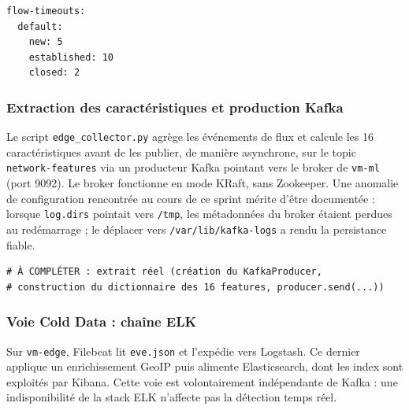 \begin{lstlisting}[style=ngidps, caption={Réglage des délais d'expiration des flux (\texttt{suricata.yaml})}, label={lst:suricata-timeouts}]
flow-timeouts:
  default:
    new: 5
    established: 10
    closed: 2
\end{lstlisting}


\subsubsection{Extraction des caractéristiques et production Kafka}

Le script \texttt{edge\_collector.py} agrège les événements de flux et calcule les 16 caractéristiques avant de les publier, de manière asynchrone, sur le topic \texttt{network-features} via un producteur Kafka pointant vers le broker de \texttt{vm-ml} (port 9092). Le broker fonctionne en mode KRaft, sans Zookeeper. Une anomalie de configuration rencontrée au cours de ce sprint mérite d'être documentée : lorsque \texttt{log.dirs} pointait vers \texttt{/tmp}, les métadonnées du broker étaient perdues au redémarrage ; le déplacer vers \texttt{/var/lib/kafka-logs} a rendu la persistance fiable.

\begin{lstlisting}[style=ngidps, caption={Extrait de \texttt{edge\_collector.py} : publication du vecteur de caractéristiques}, label={lst:edge-collector}]
# À COMPLÉTER : extrait réel (création du KafkaProducer,
# construction du dictionnaire des 16 features, producer.send(...))
\end{lstlisting}


\subsubsection{Voie Cold Data : chaîne ELK}

Sur \texttt{vm-edge}, Filebeat lit \texttt{eve.json} et l'expédie vers Logstash. Ce dernier applique un enrichissement GeoIP puis alimente Elasticsearch, dont les index sont exploités par Kibana. Cette voie est volontairement indépendante de Kafka : une indisponibilité de la stack ELK n'affecte pas la détection temps réel.

